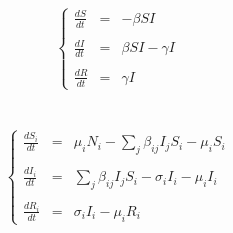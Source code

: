 \documentclass[11pt]{article} %
\begin{document}
\section{}
\begin{equation}\label{eq:1}
\left \{
\begin{array}{lcl}
\frac{dS}{dt} & = & - \beta SI \\ \\
\frac{dI}{dt} & = & \beta SI - \gamma I \\ \\
\frac{dR}{dt} & = & \gamma I
\end{array}
\right.
\end{equation}


\section{}
\begin{equation}\label{eq:2}
\left \{
\begin{array}{lcl}
\frac{dS_i}{dt} & = & \mu_i N_i - \sum_{j} \beta_{ij} I_j S_i - \mu_i S_i \\ \\
\frac{dI_i}{dt}  & = &  \sum_{j} \beta_{ij} I_j S_i - \sigma_i I_i - \mu_i I_i \\ \\
\frac{dR_i}{dt} & = & \sigma_i I_i - \mu_i R_i
\end{array}
\right.
\end{equation}
\end{document}
